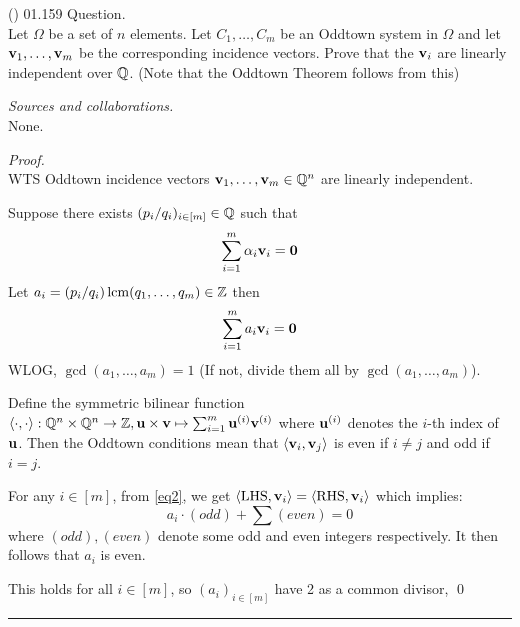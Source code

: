 \documentclass{amsart}
\begin{document}
\newpage
\Large
{}

\noindent
(\done) 01.159 Question. \\
Let $\Omega$ be a set of $n$ elements. Let $C_1, \ldots, C_m$ be an Oddtown system in $\Omega$ and let $\mathbf{v}_1, \ldots, \mathbf{v}_m$ be the corresponding incidence vectors. Prove that the $\mathbf{v}_i$ are linearly independent over $\mathbb{Q}$. (Note that the Oddtown Theorem follows from this)

\medskip\noindent
\emph{Sources and collaborations.}\\
None.

\medskip\noindent
\emph{Proof.}\\
WTS Oddtown incidence vectors $\mathbf{v}_1, \ldots, \mathbf{v}_m \in \mathbb{Q}^n$ are linearly independent.

Suppose there exists $(p_i/q_i)_{i \in [m]} \in \mathbb{Q}$ such that \begin{equation*}
\sum_{i=1}^{m}   \alpha_i \mathbf{v}_i = \mathbf{0}
\end{equation*}
Let $a_i = (p_i/q_i) \operatorname*{lcm}(q_1, \ldots, q_m) \in \mathbb{Z}$ then
\begin{equation} \label{eq2}
\sum_{i=1}^{m} a_i \mathbf{v}_i = \mathbf{0}
\end{equation}
WLOG, $\gcd(a_1, \ldots, a_m) = 1$ (If not, divide them all by $\gcd(a_1, \ldots, a_m)$).

Define the symmetric bilinear function $\langle \cdot, \cdot \rangle: \mathbb{Q}^n \times \mathbb{Q}^n \to \mathbb{Z}, \mathbf{u} \times \mathbf{v} \mapsto \sum_{i=1}^{m} \mathbf{u}^{(i)} \mathbf{v}^{(i)}$ where $\mathbf{u}^{(i)}$ denotes the $i$-th index of $\mathbf{u}$. Then the Oddtown conditions mean that $\langle \mathbf{v}_i, \mathbf{v}_j \rangle$ is even if $i \neq j$ and odd if $i = j$.

For any $i \in [m]$, from \eqref{eq2}, we get $\langle \mathrm{LHS}, \mathbf{v}_i \rangle = \langle \mathrm{RHS}, \mathbf{v}_i \rangle$ which implies:
\begin{equation*}
a_i \cdot (odd) + \sum (even) = 0
\end{equation*}
where $(odd), (even)$ denote some odd and even integers respectively. It then follows that $a_i$ is even.

This holds for all $i \in [m]$, so $(a_i)_{i \in [m]}$ have 2 as a common divisor, \contra
\qed
\bigskip\hrule

\vspace{0.5cm}
\end{document}
